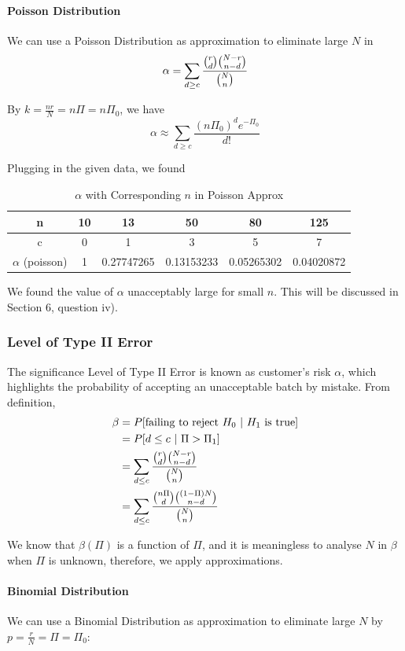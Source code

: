 \documentclass[a4paper]{article}
\begin{document}
\paragraph{Poisson Distribution}
We can use a Poisson Distribution as approximation to eliminate large $N$ in
$$\alpha = \sum_{d\geq c} \displaystyle\frac{\tbinom{r}{d}\tbinom{N-r}{n-d}}{\tbinom{N}{n}}$$

By $k = \displaystyle\frac{nr}{N}=n\Pi=n\Pi_0$, we have
$$\alpha \approx \sum_{d\geq c} \frac{(n\Pi_0)^de^{-\Pi_0}}{d!}$$

Plugging in the given data, we found
\begin{table}[!htbp]
  \centering
    \begin{tabular}{|c|c|c|c|c|c|}
    \hline
    n     & 10    & 13    & 50    & 80    & 125 \\
    \hline
    c     & 0     & 1     & 3     & 5     & 7 \\
    \hline
    $\alpha$ (poisson) & 1     & 0.27747265 & 0.13153233 & 0.05265302 & 0.04020872 \\
    \hline
    \end{tabular}%
    \caption{$\alpha$ with Corresponding $n$ in Poisson Approx}
\end{table}%

We found the value of $\alpha$ unacceptably large for small $n$. This will be discussed in Section 6, question iv).
\subsubsection{Level of Type II Error}
The significance Level of Type II Error is known as customer's risk $\alpha$, which highlights the probability of accepting an unacceptable batch by mistake. From definition,
\begin{align*}
\beta
&= P[\text{failing to reject }H_0\ |\ H_1 \text{ is true}]\\
&= P[d\leq c\ |\ \Pi > \Pi_1]\\
&= \sum_{d\leq c} \displaystyle\frac{\tbinom{r}{d}\tbinom{N-r}{n-d}}{\tbinom{N}{n}}\\
&= \sum_{d\leq c} \displaystyle\frac{\tbinom{n\Pi}{d}\tbinom{(1-\Pi)N}{n-d}}{\tbinom{N}{n}}
\end{align*}

We know that $\beta(\Pi)$ is a function of $\Pi$, and it is meaningless to analyse $N$ in $\beta$ when $\Pi$ is unknown, therefore, we apply approximations.

\paragraph{Binomial Distribution}
We can use a Binomial Distribution as approximation to eliminate large $N$ by $p = \displaystyle\frac{r}{N}=\Pi=\Pi_0$:
\end{document}
